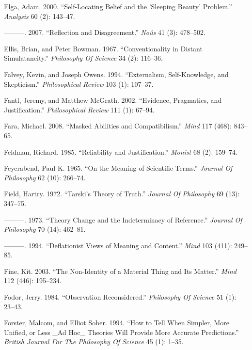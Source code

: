 \documentclass[
  10pt,
  letterpaper,
  DIV=11,
  numbers=noendperiod,
  twoside]{scrartcl}
\newlength{\cslhangindent}
\newenvironment{CSLReferences}[2] %
 {\begin{list}{}{%
  \setlength{\itemindent}{0pt}
  \setlength{\leftmargin}{0pt}
  \setlength{\parsep}{0pt}
  \ifodd #1
   \setlength{\leftmargin}{\cslhangindent}
   \setlength{\itemindent}{-1\cslhangindent}
  \fi
  \setlength{\itemsep}{#2\baselineskip}}}
 {\end{list}}
\begin{document}
\begin{CSLReferences}{1}{0}
Elga, Adam. 2000. {``Self-Locating Belief and the 'Sleeping Beauty'
Problem.''} \emph{Analysis} 60 (2): 143--47.

---------. 2007. {``Reflection and Disagreement.''} \emph{Noûs} 41 (3):
478--502.

Ellis, Brian, and Peter Bowman. 1967. {``Conventionality in Distant
Simulataneity.''} \emph{Philosophy Of Science} 34 (2): 116--36.

Falvey, Kevin, and Joseph Owens. 1994. {``Externalism, Self-Knowledge,
and Skepticism.''} \emph{Philosophical Review} 103 (1): 107--37.

Fantl, Jeremy, and Matthew McGrath. 2002. {``Evidence, Pragmatics, and
Justification.''} \emph{Philosophical Review} 111 (1): 67--94.

Fara, Michael. 2008. {``Masked Abilities and Compatibilism.''}
\emph{Mind} 117 (468): 843--65.

Feldman, Richard. 1985. {``Reliability and Justification.''}
\emph{Monist} 68 (2): 159--74.

Feyerabend, Paul K. 1965. {``On the Meaning of Scientific Terms.''}
\emph{Journal Of Philosophy} 62 (10): 266--74.

Field, Hartry. 1972. {``Tarski's Theory of Truth.''} \emph{Journal Of
Philosophy} 69 (13): 347--75.

---------. 1973. {``Theory Change and the Indeterminacy of Reference.''}
\emph{Journal Of Philosophy} 70 (14): 462--81.

---------. 1994. {``Deflationist Views of Meaning and Content.''}
\emph{Mind} 103 (411): 249--85.

Fine, Kit. 2003. {``The Non-Identity of a Material Thing and Its
Matter.''} \emph{Mind} 112 (446): 195--234.

Fodor, Jerry. 1984. {``Observation Reconsidered.''} \emph{Philosophy Of
Science} 51 (1): 23--43.

Forster, Malcom, and Elliot Sober. 1994. {``How to Tell When Simpler,
More Unified, or Less \_Ad Hoc\_ Theories Will Provide More Accurate
Predictions.''} \emph{British Journal For The Philosophy Of Science} 45
(1): 1--35.


\end{CSLReferences}
\end{document}
